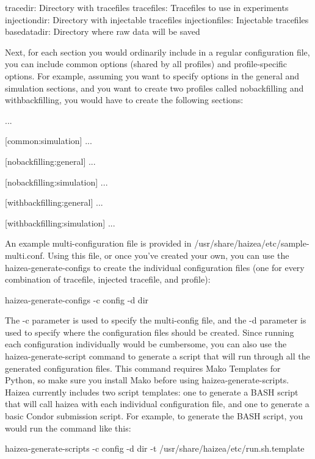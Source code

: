 \begin{wideshellverbatim}
[multi]
tracedir: Directory with tracefiles
tracefiles: Tracefiles to use in experiments
injectiondir: Directory with injectable tracefiles
injectionfiles: Injectable tracefiles
basedatadir: Directory where raw data will be saved
\end{wideshellverbatim}

Next, for each section you would ordinarily include in a regular configuration file, you can include common options (shared by all profiles) and profile-specific options. For example, assuming you want to specify options in the general and simulation sections, and you want to create two profiles called nobackfilling and withbackfilling, you would have to create the following sections:

\begin{wideshellverbatim}
...

[common:simulation]
...

[nobackfilling:general]
...

[nobackfilling:simulation]
...

[withbackfilling:general]
...

[withbackfilling:simulation]
...
\end{wideshellverbatim}

An example multi-configuration file is provided in /usr/share/haizea/etc/sample-multi.conf. Using this file, or once you've created your own, you can use the haizea-generate-configs to create the individual configuration files (one for every combination of tracefile, injected tracefile, and profile):

\begin{wideshellverbatim}
haizea-generate-configs -c config -d dir
\end{wideshellverbatim}

The -c parameter is used to specify the multi-config file, and the -d parameter is used to specify where the configuration files should be created. Since running each configuration individually would be cumbersome, you can also use the haizea-generate-script command to generate a script that will run through all the generated configuration files. This command requires Mako Templates for Python, so make sure you install Mako before using haizea-generate-scripts. Haizea currently includes two script templates: one to generate a BASH script that will call haizea with each individual configuration file, and one to generate a basic Condor submission script. For example, to generate the BASH script, you would run the command like this:

\begin{wideshellverbatim}
haizea-generate-scripts -c config -d dir -t /usr/share/haizea/etc/run.sh.template
\end{wideshellverbatim}

